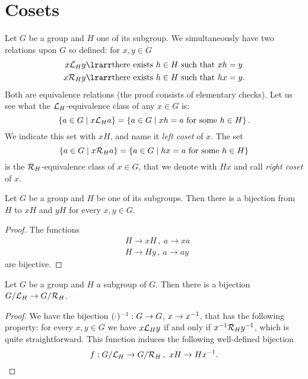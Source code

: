 
\section{Cosets}

Let \(G\) be a group and \(H\) one of its subgroup. We simultaneously have two relations upon \(G\) so defined: for \(x, y \in G\)
\begin{align*}
x \call_H y & \lrarr \text{there exists } h \in H \text{ such that } xh = y \\
x \calr_H y & \lrarr \text{there exists } h \in H \text{ such that } hx = y .
\end{align*}
Both are equivalence relations (the proof consists of elementary checks). Let us see what the \(\mathcal L_H\)-equivalence class of any \(x \in G\) is:
\[\left\{a \in G \mid x \mathcal L_H a\right\} = \left\{a \in G \mid xh = a \text{ for some } h \in H\right\}.\]
We indicate this set with \(xH\), and name it {\em left coset} of \(x\). The set
\[\left\{a \in G \mid x \mathcal R_H a\right\} = \left\{a \in G \mid hx = a \text{ for some } h \in H\right\}\]
is the \(\mathcal R_H\)-equivalence class of \(x \in G\), that we denote with \(Hx\) and call {\em right coset} of \(x\).

\begin{proposition}\label{prop:CosetsHaveTheSameCardinality}
Let \(G\) be a group and \(H\) be one of its subgroups. Then there is a bijection from \(H\) to \(xH\) and \(yH\) for every \(x, y \in G\).
\end{proposition}

\begin{proof}
The functions
\begin{align*}
& H \to xH\,, \ a \to xa \\
& H \to Hy\,, \ a \to ay
\end{align*}
are bijective.
\end{proof}

\begin{proposition}
Let \(G\) be a group and \(H\) a subgroup of \(G\). Then there is a bijection \(G/\mathcal L_H \to G/\mathcal R_H\).
\end{proposition}

\begin{proof}
We have the bijection \((\cdot)^{-1} : G \to G\), \(x \to x^{-1}\), that has the following property: for every \(x, y \in G\) we have \(x \mathcal L_H y\) if and only if \(x^{-1} \mathcal R_H y^{-1}\), which is quite straightforward. This function induces the following well-defined bijection
\[f : G/\call_H \to G/\calr_H\,, \ xH \to H\inv x.\qedhere\]
\end{proof}

